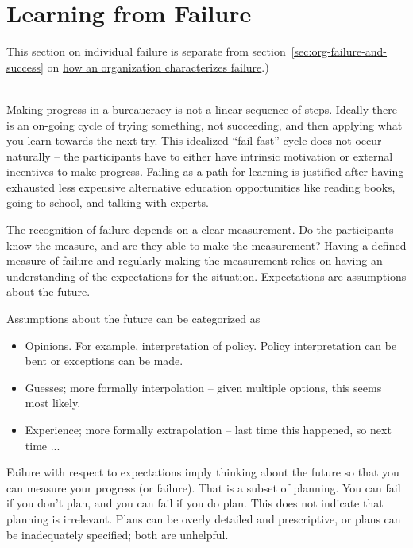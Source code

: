 \section{Learning from Failure\label{sec:learn-from-failure}}

This section on individual failure is separate from
\ifsectionref
section~\ref{sec:org-failure-and-success} on 
\fi
\hyperref[sec:org-failure-and-success]{how an organization characterizes failure}.)

\ \\

Making progress in a bureaucracy is not a linear sequence of steps. Ideally there is an on-going cycle of trying something, not succeeding, and then applying what you learn towards the next try. This idealized ``\href{https://en.wikipedia.org/wiki/Fail-fast#Business}{fail fast}'' cycle does not occur naturally -- the participants have to either have intrinsic motivation or external incentives to make progress. Failing as a path for learning is justified after having exhausted less expensive alternative education opportunities like reading books, going to school, and talking with experts. 

The recognition of failure depends on a clear measurement. Do the participants know the measure, and are they able to make the measurement? Having a defined measure of failure and regularly making the measurement relies on having an understanding of the expectations for the situation. Expectations are assumptions about the future.

Assumptions about the future can be categorized as
\begin{itemize}
    \item Opinions. For example, interpretation of policy. Policy interpretation can be bent or exceptions can be made. 
    \item Guesses; more formally interpolation -- given multiple options, this seems most likely.
    \item Experience; more formally extrapolation -- last time this happened, so next time ...
\end{itemize}

Failure with respect to expectations imply thinking about the future so that you can measure your progress (or failure). That is a subset of planning. You can fail if you don't plan, and you can fail if you do plan. This does not indicate that planning is irrelevant. Plans can be overly detailed and prescriptive, or plans can be inadequately specified; both are unhelpful.

